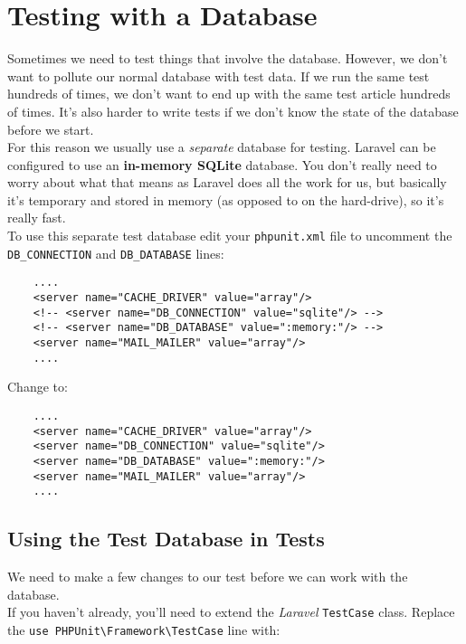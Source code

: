 

\section{Testing with a Database}

Sometimes we need to test things that involve the database. However, we don't want to pollute our normal database with test data. If we run the same test hundreds of times, we don't want to end up with the same test article hundreds of times. It's also harder to write tests if we don't know the state of the database before we start.
\\

For this reason we usually use a \textit{separate} database for testing. Laravel can be configured to use an \textbf{in-memory SQLite} database. You don't really need to worry about what that means as Laravel does all the work for us, but basically it's temporary and stored in memory (as opposed to on the hard-drive), so it's really fast.
\\

To use this separate test database edit your \texttt{phpunit.xml} file to uncomment the \texttt{DB\_CONNECTION} and \texttt{DB\_DATABASE} lines:

\begin{verbatim}
    ....
    <server name="CACHE_DRIVER" value="array"/>
    <!-- <server name="DB_CONNECTION" value="sqlite"/> -->
    <!-- <server name="DB_DATABASE" value=":memory:"/> -->
    <server name="MAIL_MAILER" value="array"/>
    ....
\end{verbatim}

Change to:

\begin{verbatim}
    ....
    <server name="CACHE_DRIVER" value="array"/>
    <server name="DB_CONNECTION" value="sqlite"/>
    <server name="DB_DATABASE" value=":memory:"/>
    <server name="MAIL_MAILER" value="array"/>
    ....
\end{verbatim}

\subsection{Using the Test Database in Tests}

We need to make a few changes to our test before we can work with the database.
\\

If you haven't already, you'll need to extend the \textit{Laravel} \texttt{TestCase} class. Replace the \texttt{use PHPUnit\textbackslash{}Framework\textbackslash{}TestCase} line with:

